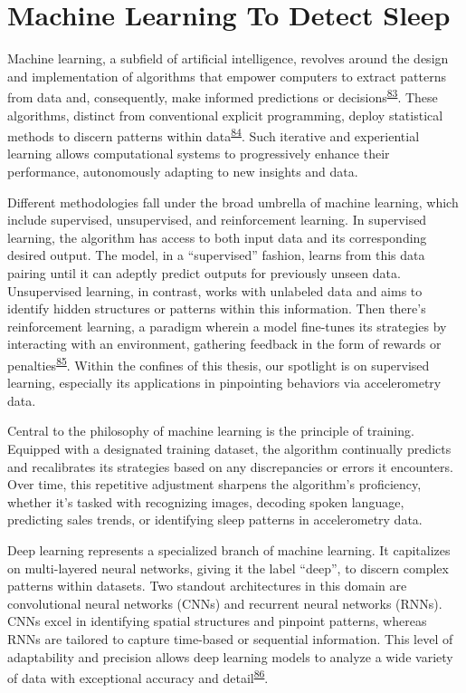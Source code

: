 \documentclass[
  10pt,
]{scrbook}
\begin{document}
\hypertarget{machine-learning-to-detect-sleep}{%
\section{Machine Learning To Detect
Sleep}\label{machine-learning-to-detect-sleep}}

Machine learning, a subfield of artificial intelligence, revolves around
the design and implementation of algorithms that empower computers to
extract patterns from data and, consequently, make informed predictions
or
decisions\textsuperscript{\protect\hyperlink{ref-hastie01statisticallearning}{83}}.
These algorithms, distinct from conventional explicit programming,
deploy statistical methods to discern patterns within
data\textsuperscript{\protect\hyperlink{ref-bishop_2006}{84}}. Such
iterative and experiential learning allows computational systems to
progressively enhance their performance, autonomously adapting to new
insights and data.

Different methodologies fall under the broad umbrella of machine
learning, which include supervised, unsupervised, and reinforcement
learning. In supervised learning, the algorithm has access to both input
data and its corresponding desired output. The model, in a
``supervised'' fashion, learns from this data pairing until it can
adeptly predict outputs for previously unseen data. Unsupervised
learning, in contrast, works with unlabeled data and aims to identify
hidden structures or patterns within this information. Then there's
reinforcement learning, a paradigm wherein a model fine-tunes its
strategies by interacting with an environment, gathering feedback in the
form of rewards or
penalties\textsuperscript{\protect\hyperlink{ref-sutton_1998}{85}}.
Within the confines of this thesis, our spotlight is on supervised
learning, especially its applications in pinpointing behaviors via
accelerometry data.

Central to the philosophy of machine learning is the principle of
training. Equipped with a designated training dataset, the algorithm
continually predicts and recalibrates its strategies based on any
discrepancies or errors it encounters. Over time, this repetitive
adjustment sharpens the algorithm's proficiency, whether it's tasked
with recognizing images, decoding spoken language, predicting sales
trends, or identifying sleep patterns in accelerometry data.

Deep learning represents a specialized branch of machine learning. It
capitalizes on multi-layered neural networks, giving it the label
``deep'', to discern complex patterns within datasets. Two standout
architectures in this domain are convolutional neural networks (CNNs)
and recurrent neural networks (RNNs). CNNs excel in identifying spatial
structures and pinpoint patterns, whereas RNNs are tailored to capture
time-based or sequential information. This level of adaptability and
precision allows deep learning models to analyze a wide variety of data
with exceptional accuracy and
detail\textsuperscript{\protect\hyperlink{ref-Goodfellow-et-al-2016}{86}}.
\end{document}
